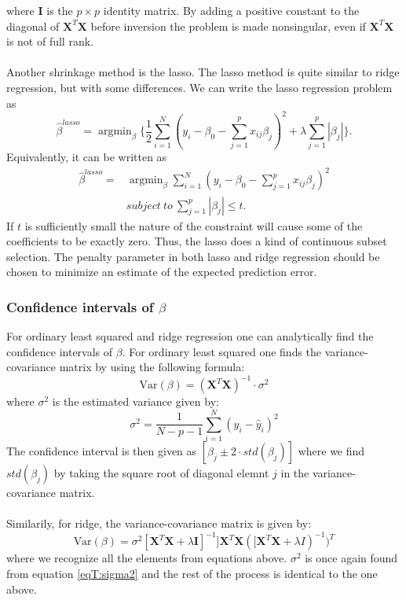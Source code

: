 \documentclass[12pt]{article}
\DeclareMathOperator*{\argmin}{argmin}
\begin{document}
where $\bm{I}$ is the $p\times{p}$ identity matrix. By adding a positive constant to the diagonal of $\bm{X}^T\bm{X}$ before inversion the problem is made nonsingular, even if $\bm{X}^T\bm{X}$ is not of full rank.\\ \\
Another shrinkage method is the lasso. The lasso method is quite similar to ridge regression, but with some differences. We can write the lasso regression problem as
\begin{equation}
\hat{\beta}^{lasso}=\argmin_{\beta}\{\frac{1}{2}\sum_{i=1}^{N}(y_i-\beta_0-\sum_{j=1}^{p}x_{ij}\beta_j)^2+\lambda\sum_{j=1}^{p}\left|\beta_j\right|\}.
\label{eq:lasso}
\end{equation}
Equivalently, it can be written as
\begin{equation}
\begin{split}
\hat{\beta}^{lasso}=&\argmin_{\beta}\sum_{i=1}^{N}(y_i-\beta_0-\sum_{j=1}^{p}x_{ij}\beta_j)^2\\
&subject\ to\ \sum_{j=1}^{p}\left|\beta_j\right|\leq{t}.
\end{split}
\end{equation}
If $t$ is sufficiently small the nature of the constraint will cause some of the coefficients to be exactly zero. Thus, the lasso does a kind of continuous subset selection. The penalty parameter in both lasso and ridge regression should be chosen to minimize an estimate of the expected prediction error.\\
\subsubsection{Confidence intervals of $\beta$}
For ordinary least squared and ridge regression one can analytically find the confidence intervals of $\beta$. For ordinary least squared one finds the variance-covariance matrix by using the following formula:
\begin{equation}
\text{Var}(\beta) = (\bm{X}^T\bm{X})^{-1}\cdot \sigma^2
\end{equation}
where $\sigma^2$ is the estimated variance given by:
\begin{equation}
\sigma^2 = \frac{1}{N - p - 1} \sum\limits_{i=1}^N(y_i - \hat{y}_i)^2
\label{eqT:sigma2}
\end{equation}
The confidence interval is then given as $[\beta_j \pm 2\cdot std(\beta_j)]$ where we find $std(\beta_j)$ by taking the square root of diagonal elemnt $j$ in the variance-covariance matrix. \\ \\
Similarily, for ridge, the variance-covariance matrix is given by:
\begin{equation}
\text{Var}(\beta) = \sigma^2[\bm{X}^T\bm{X} + \lambda \bm{I}]^{-1}]\bm{X}^T\bm{X}([\bm{X}^T\bm{X} + \lambda I)^{-1})^T
\end{equation}
where we recognize all the elements from equations above. $\sigma^2$ is once again found from equation \eqref{eqT:sigma2} and the rest of the process is identical to the one above.
\end{document}
